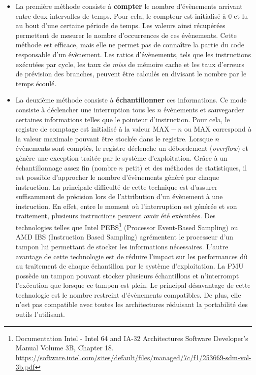             \begin{itemize}
                \item La première méthode consiste à \textbf{compter} le nombre d'évènements arrivant entre deux intervalles de temps. Pour cela, le compteur est initialisé à $0$ et lu au bout d'une certaine période de temps. Les valeurs ainsi récupérées permettent de mesurer le nombre d'occurrences de ces évènements. Cette méthode est efficace, mais elle ne permet pas de connaître la partie du code responsable d'un évènement. Les ratios d'évènements, tels que les instructions exécutées par cycle, les taux de \textit{miss} de mémoire cache et les taux d'erreurs de prévision des branches, peuvent être calculés en divisant le nombre par le temps écoulé.
                
                \item La deuxième méthode consiste à \textbf{échantillonner} ces informations. Ce mode consiste à déclencher une interruption tous les $n$ évènements et sauvegarder certaines informations telles que le pointeur d'instruction. Pour cela, le registre de comptage est initialisé à la valeur $\text{MAX} - n$ ou $\text{MAX}$ correspond à la valeur maximale pouvant être stockée dans le registre. Lorsque $n$ évènements sont comptés, le registre déclenche un débordement (\textit{overflow}) et génère une exception traitée par le système d'exploitation. Grâce à un échantillonnage assez fin (nombre $n$ petit) et des méthodes de statistiques, il est possible d'approcher le nombre d'évènements généré par chaque instruction. La principale difficulté de cette technique est d'assurer suffisamment de précision lors de l'attribution d'un évènement à une instruction. En effet, entre le moment où l'interruption est générée et son traitement, plusieurs instructions peuvent avoir été exécutées. Des technologies telles que Intel PEBS\footnote{Documentation Intel - Intel 64 and IA-32 Architectures Software Developer's Manual Volume 3B, Chapter 18. \url{https://software.intel.com/sites/default/files/managed/7c/f1/253669-sdm-vol-3b.pdf}} (Processor Event-Based Sampling) ou AMD IBS (Instruction Based Sampling) \cite{Drongowski2007} agrémentent le processeur d'un tampon lui permettant de stocker les informations nécessaires. L'autre avantage de cette technologie est de réduire l'impact sur les performances dû au traitement de chaque échantillon par le système d'exploitation. La PMU possède un tampon pouvant stocker plusieurs échantillons et n'interrompt l'exécution que lorsque ce tampon est plein. Le principal désavantage de cette technologie est le nombre restreint d'évènements compatibles. De plus, elle n'est pas compatible avec toutes les architectures réduisant la portabilité des outils l'utilisant.
            \end{itemize}
                
